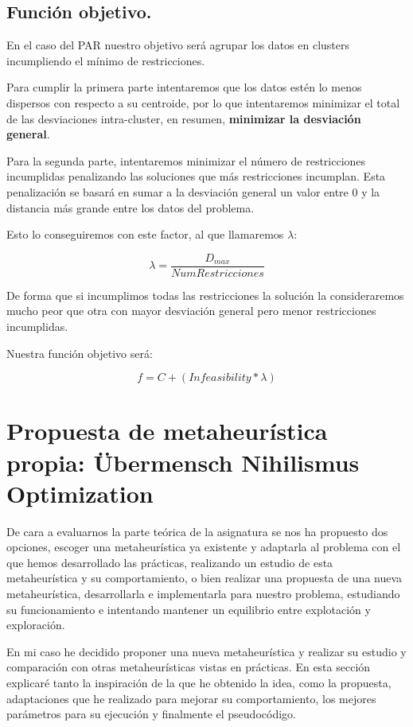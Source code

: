 \documentclass[12pt, spanish]{article}
\begin{document}
\subsection{Función objetivo.}

En el caso del PAR nuestro objetivo será agrupar los datos en clusters incumpliendo el mínimo de restricciones.

Para cumplir la primera parte intentaremos que los datos estén lo menos dispersos con respecto a su centroide, por lo que intentaremos minimizar el total de las desviaciones intra-cluster, en resumen, \textbf{minimizar la desviación general}.

Para la segunda parte, intentaremos minimizar el número de restricciones incumplidas penalizando las soluciones que más restricciones incumplan. Esta penalización se basará en sumar a la desviación general un valor entre 0 y la distancia más grande entre los datos del problema.

Esto lo conseguiremos con este factor, al que llamaremos $\lambda$:

$$ \lambda = \frac{D_{max}}{NumRestricciones} $$


De forma que si incumplimos todas las restricciones la solución la consideraremos mucho peor que otra con mayor desviación general pero menor restricciones incumplidas.

Nuestra función objetivo será:

$$ f = C + (\textit{Infeasibility} * \lambda) $$


\newpage

\section{Propuesta de metaheurística propia: Übermensch Nihilismus Optimization}

De cara a evaluarnos la parte teórica de la asignatura se nos ha propuesto dos opciones, escoger una metaheurística ya existente y adaptarla al problema con el que hemos desarrollado las prácticas, realizando un estudio de esta metaheurística y su comportamiento, o bien realizar una propuesta de una nueva metaheurística, desarrollarla e implementarla para nuestro problema, estudiando su funcionamiento e intentando mantener un equilibrio entre explotación y exploración.

En mi caso he decidido proponer una nueva metaheurística y realizar su estudio y comparación con otras metaheurísticas vistas en prácticas. En esta sección explicaré tanto la inspiración de la que he obtenido la idea, como  la propuesta, adaptaciones que he realizado para mejorar su comportamiento, los mejores parámetros para su ejecución y finalmente el pseudocódigo.
\end{document}
